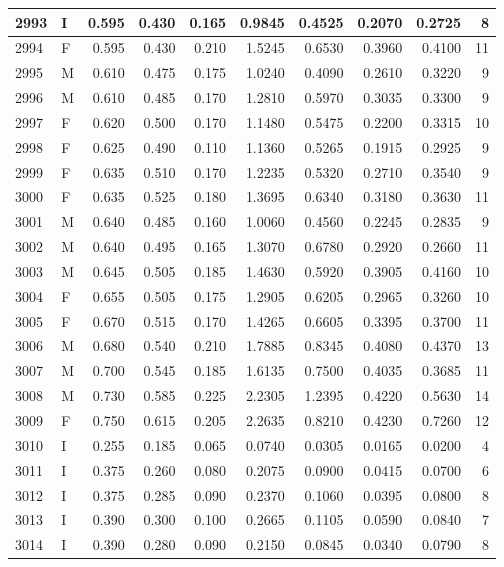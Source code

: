 \documentclass[9pt,twocolumn,twoside,]{pnas-new}
\begin{document}
\begin{tabular}{l|l|r|r|r|r|r|r|r|r}
\hline
2993 & I & 0.595 & 0.430 & 0.165 & 0.9845 & 0.4525 & 0.2070 & 0.2725 & 8\\
\hline
2994 & F & 0.595 & 0.430 & 0.210 & 1.5245 & 0.6530 & 0.3960 & 0.4100 & 11\\
\hline
2995 & M & 0.610 & 0.475 & 0.175 & 1.0240 & 0.4090 & 0.2610 & 0.3220 & 9\\
\hline
2996 & M & 0.610 & 0.485 & 0.170 & 1.2810 & 0.5970 & 0.3035 & 0.3300 & 9\\
\hline
2997 & F & 0.620 & 0.500 & 0.170 & 1.1480 & 0.5475 & 0.2200 & 0.3315 & 10\\
\hline
2998 & F & 0.625 & 0.490 & 0.110 & 1.1360 & 0.5265 & 0.1915 & 0.2925 & 9\\
\hline
2999 & F & 0.635 & 0.510 & 0.170 & 1.2235 & 0.5320 & 0.2710 & 0.3540 & 9\\
\hline
3000 & F & 0.635 & 0.525 & 0.180 & 1.3695 & 0.6340 & 0.3180 & 0.3630 & 11\\
\hline
3001 & M & 0.640 & 0.485 & 0.160 & 1.0060 & 0.4560 & 0.2245 & 0.2835 & 9\\
\hline
3002 & M & 0.640 & 0.495 & 0.165 & 1.3070 & 0.6780 & 0.2920 & 0.2660 & 11\\
\hline
3003 & M & 0.645 & 0.505 & 0.185 & 1.4630 & 0.5920 & 0.3905 & 0.4160 & 10\\
\hline
3004 & F & 0.655 & 0.505 & 0.175 & 1.2905 & 0.6205 & 0.2965 & 0.3260 & 10\\
\hline
3005 & F & 0.670 & 0.515 & 0.170 & 1.4265 & 0.6605 & 0.3395 & 0.3700 & 11\\
\hline
3006 & M & 0.680 & 0.540 & 0.210 & 1.7885 & 0.8345 & 0.4080 & 0.4370 & 13\\
\hline
3007 & M & 0.700 & 0.545 & 0.185 & 1.6135 & 0.7500 & 0.4035 & 0.3685 & 11\\
\hline
3008 & M & 0.730 & 0.585 & 0.225 & 2.2305 & 1.2395 & 0.4220 & 0.5630 & 14\\
\hline
3009 & F & 0.750 & 0.615 & 0.205 & 2.2635 & 0.8210 & 0.4230 & 0.7260 & 12\\
\hline
3010 & I & 0.255 & 0.185 & 0.065 & 0.0740 & 0.0305 & 0.0165 & 0.0200 & 4\\
\hline
3011 & I & 0.375 & 0.260 & 0.080 & 0.2075 & 0.0900 & 0.0415 & 0.0700 & 6\\
\hline
3012 & I & 0.375 & 0.285 & 0.090 & 0.2370 & 0.1060 & 0.0395 & 0.0800 & 8\\
\hline
3013 & I & 0.390 & 0.300 & 0.100 & 0.2665 & 0.1105 & 0.0590 & 0.0840 & 7\\
\hline
3014 & I & 0.390 & 0.280 & 0.090 & 0.2150 & 0.0845 & 0.0340 & 0.0790 & 8\\

\end{tabular}
\end{document}
